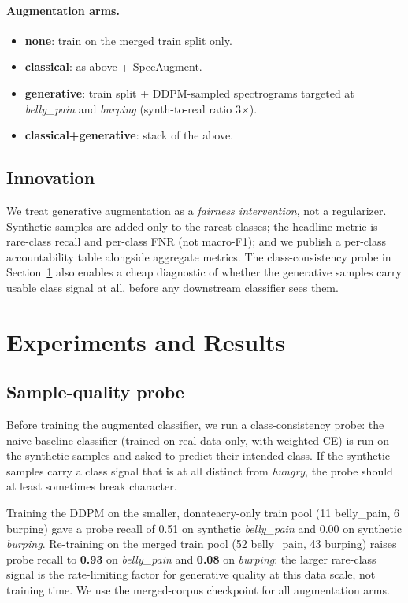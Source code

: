 \documentclass[final]{article}
\begin{document}
\paragraph{Augmentation arms.}
\begin{itemize}
\item \textbf{none}: train on the merged train split only.
\item \textbf{classical}: as above + SpecAugment.
\item \textbf{generative}: train split + DDPM-sampled spectrograms targeted at \textit{belly\_pain} and \textit{burping} (synth-to-real ratio 3$\times$).
\item \textbf{classical+generative}: stack of the above.
\end{itemize}

\subsection{Innovation}
We treat generative augmentation as a \emph{fairness intervention}, not a regularizer. Synthetic samples are added only to the rarest classes; the headline metric is rare-class recall and per-class FNR (not macro-F1); and we publish a per-class accountability table alongside aggregate metrics. The class-consistency probe in Section~\ref{sec:expts} also enables a cheap diagnostic of whether the generative samples carry usable class signal at all, before any downstream classifier sees them.

\section{Experiments and Results}\label{sec:expts}

\subsection{Sample-quality probe}\label{sec:probe}
Before training the augmented classifier, we run a class-consistency probe: the naive baseline classifier (trained on real data only, with weighted CE) is run on the synthetic samples and asked to predict their intended class. If the synthetic samples carry a class signal that is at all distinct from \textit{hungry}, the probe should at least sometimes break character.

Training the DDPM on the smaller, donateacry-only train pool (11 belly\_pain, 6 burping) gave a probe recall of 0.51 on synthetic \textit{belly\_pain} and 0.00 on synthetic \textit{burping}. Re-training on the merged train pool (52 belly\_pain, 43 burping) raises probe recall to \textbf{0.93} on \textit{belly\_pain} and \textbf{0.08} on \textit{burping}: the larger rare-class signal is the rate-limiting factor for generative quality at this data scale, not training time. We use the merged-corpus checkpoint for all augmentation arms.
\end{document}
